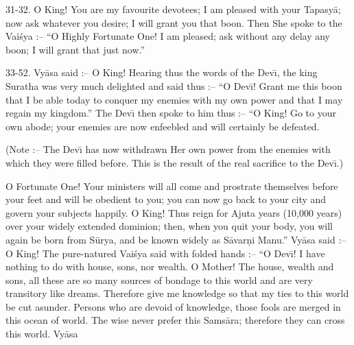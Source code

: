 31-32. O King! You are my favourite devotees; I am pleased with your Tapasy\=a; now ask whatever you desire; I will grant you that boon. Then She spoke to the Vai\'sya :-- ``O Highly Fortunate One! I am pleased; ask without any delay any boon; I will grant that just now.''

33-52. Vy\=asa said :-- O King! Hearing thus the words of the Dev\={\i}, the king Suratha was very much delighted and said thus :-- ``O Dev\={\i}! Grant me this boon that I be able today to conquer my enemies with my own power and that I may regain my kingdom.'' The Dev\={\i} then spoke to him thus :-- ``O King! Go to your own abode; your enemies are now enfeebled and will certainly be defeated.

(Note :-- The Dev\={\i} has now withdrawn Her own power from the enemies with which they were filled before. This is the result of the real sacrifice to the Dev\={\i}.)

O Fortunate One! Your ministers will all come and prostrate themselves before your feet and will be obedient to you; you can now go back to your city and govern your subjects happily. O King! Thus reign for Ajuta years (10,000 years) over your widely extended dominion; then, when you quit your body, you will again be born from S\=urya, and be known widely as S\=avar\d{n}i Manu.'' Vy\=asa said :-- O King! The pure-natured Vai\'sya said with folded hands :-- ``O Dev\={\i}! I have nothing to do with house, sons, nor wealth. O Mother! The house, wealth and sons, all these are so many sources of bondage to this world and are very transitory like dreams. Therefore give me knowledge so that my ties to this world be cut asunder. Persons who are devoid of knowledge, those fools are merged in this ocean of world. The wise never prefer this Sams\=ara; therefore they can cross this world. Vy\=asa

